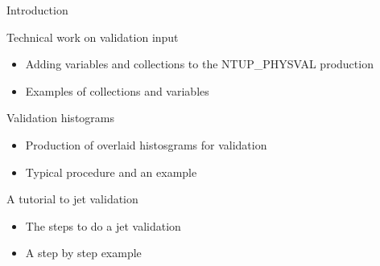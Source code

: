 \begin{frame}{Introduction}
    \begin{block}{Technical work on validation input}
        \begin{itemize}
            \item Adding variables and collections to the NTUP\_PHYSVAL production
            \item Examples of collections and variables
        \end{itemize}
    \end{block}
    \begin{block}{Validation histograms}
        \begin{itemize}
            \item Production of overlaid histosgrams for validation
            \item Typical procedure and an example
        \end{itemize}
    \end{block}
    \begin{block}{A tutorial to jet validation}
        \begin{itemize}
            \item The steps to do a jet validation
            \item A step by step example
        \end{itemize}
    \end{block}
\end{frame}